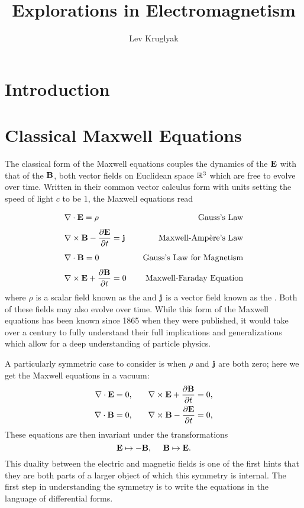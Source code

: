 \documentclass{article}
\title{\textbf{Explorations in Electromagnetism}}
\date{}
\author{Lev Kruglyak}
\begin{document}
\maketitle
\begin{abstract}
\end{abstract}
\tableofcontents
\pagebreak

\section{Introduction}
\cite{bott1985}
\cite{baez1994}

\section{Classical Maxwell Equations}

The classical form of the Maxwell equations couples the dynamics of the  $\mathbf{E}$ with that of the  $\mathbf{B}$, both vector fields on Euclidean space $\mathbb{R}^3$ which are free to evolve over time. Written in their common vector calculus form with units setting the speed of light $c$ to be $1$, the Maxwell equations read
\[
    \begin{aligned}
      &\nabla\cdot \mathbf{E} = \vphantom{\frac11}\rho \quad&\textrm{Gauss's Law}\\
      &\nabla \times \mathbf{B} - {\frac{\partial \mathbf{E}}{\partial t}} = \mathbf{j}\quad&\textrm{Maxwell-Amp\`ere's Law}\\
      &\nabla \cdot \mathbf{B} = \vphantom{\frac11}0\quad&\textrm{Gauss's Law for Magnetism}\\ 
      &\nabla\times \mathbf{E} + {\frac{\partial \mathbf{B}}{\partial t}} = 0\quad&\textrm{Maxwell-Faraday Equation}\\
    \end{aligned}
\]
where $\rho$ is a scalar field known as the  and $\mathbf{j}$ is a vector field known as the . Both of these fields may also evolve over time. While this form of the Maxwell equations has been known since 1865 when they were published, it would take over a century to fully understand their full implications and generalizations which allow for a deep understanding of particle physics. 

A particularly symmetric case to consider is when $\rho$ and $\mathbf{j}$ are both zero; here we get the Maxwell equations in a vacuum:
\[
    \begin{aligned}
      \nabla\cdot \mathbf{E} = 0,\quad&\quad \nabla\times \mathbf{E} + \frac{\partial \mathbf{B}}{\partial t} = 0,\\
      \nabla \cdot \mathbf{B} = 0,\quad&\quad \nabla \times \mathbf{B} - \frac{\partial \mathbf{E}}{\partial t} = 0,
    \end{aligned}
\]
These equations are then invariant under the transformations
\[
      \mathbf{E} \mapsto -\mathbf{B},\quad\
      \mathbf{B} \mapsto \mathbf{E}.
\]
This duality between the electric and magnetic fields is one of the first hints that they are both parts of a larger object of which this symmetry is internal. The first step in understanding the symmetry is to write the equations in the language of differential forms.
\end{document}
